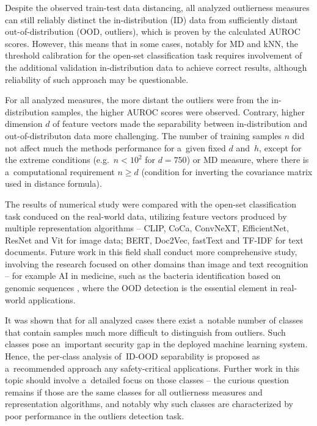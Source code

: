 Despite the observed train-test data distancing, all analyzed outlierness measures can still reliably distinct the in-distribution (ID) data from sufficiently distant out-of-distribution (OOD, outliers), which is proven by the calculated AUROC scores. However, this means that in some cases, notably for MD and kNN, the threshold calibration for the open-set classification task requires involvement of the additional validation in-distribution data to achieve correct results, although reliability of such approach may be questionable.

For all analyzed measures, the more distant the outliers were from the in-distribution samples, the higher AUROC scores were observed. Contrary, higher dimension $d$ of feature vectors made the separability between in-distribution and out-of-distributon data more challenging. The number of training samples $n$ did not affect much the methods performance for a~given fixed $d$ and~$h$, except for the extreme conditions (e.g.~$n < 10^2$ for $d = 750$) or MD measure, where there is a~computational requirement $n \geq d$ (condition for inverting the covariance matrix used in distance formula).

The results of numerical study were compared with the open-set classification task conduced on the real-world data, utilizing feature vectors produced by multiple representation algorithms – CLIP, CoCa, ConvNeXT, EfficientNet, ResNet and Vit for image data; BERT, Doc2Vec, fastText and TF-IDF for text documents. Future work in this field shall conduct more comprehensive study, involving the research focused on other domains than image and text recognition – for example AI in medicine, such as the bacteria identification based on genomic sequences \cite{Ren-2019}\cite{Fort-2021}, where the OOD detection is the essential element in real-world applications.

It was shown that for all analyzed cases there exist a~notable number of classes that contain samples much more difficult to distinguish from outliers. Such classes pose an~important security gap in the deployed machine learning system. Hence, the per-class analysis of~ID-OOD separability is proposed as a~recommended approach any safety-critical applications.
Further work in this topic should involve a~detailed focus on those classes – the curious question remains if those are the same classes for all outlierness measures and representation algorithms, and notably why such classes are characterized by poor performance in the outliers detection task.


